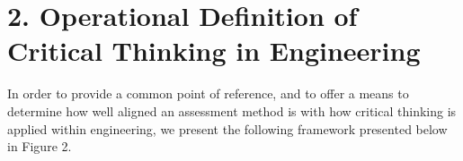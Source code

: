 \section{2. Operational Definition of Critical Thinking in Engineering}

In order to provide a common point of reference, and to offer a means to determine how well aligned an assessment method is with how critical thinking is applied within engineering, we present the following framework presented below in Figure 2.
